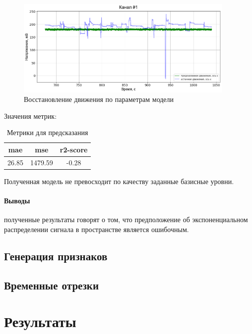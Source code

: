\documentclass{mipt-thesis-bs}
\begin{document}
\begin{figure}
\begin{center}
	\includegraphics[width=300pt,height=\textheight,keepaspectratio]{imgs/motion_by_params.png}
	\caption{Восстановление движения по параметрам модели}	
	\label{fig:motion gauss}
	\end{center}
\end{figure}

Значения метрик:
\begin{table}[h]
  
  \centering
    \begin{tabular}{ | c | c | c | }
	\hline
	mae & mse & r2-score \\ \hline
	26.85 & 1479.59 & -0.28 \\

	\hline
	\end{tabular}
\caption{Метрики для предсказания}
\label{table:gauss mae}
\end{table}
Полученная модель не превосходит по качеству заданные базисные уровни.
\subsubsection{Выводы}
полученные результаты говорят о том, что предположение об экспоненциальном распределении сигнала в пространстве является ошибочным. 

\section{Генерация признаков}

\section{Временные отрезки}

\chapter{Результаты}
\end{document}
